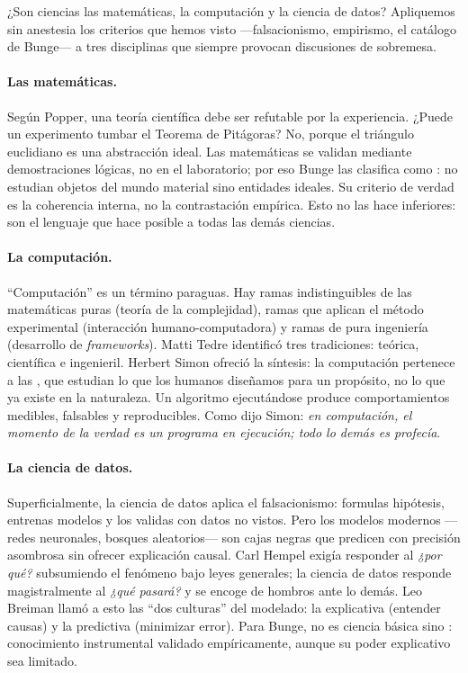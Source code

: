 \begin{digress}{¿Son ciencias las matemáticas, la computación y la ciencia de datos?}
	Apliquemos sin anestesia los criterios que hemos visto —falsacionismo, empirismo, el catálogo de Bunge— a tres disciplinas que siempre provocan discusiones de sobremesa.

	\paragraph*{Las matemáticas.} Según Popper, una teoría científica debe ser refutable por la experiencia\cite{Popper1959}.
	¿Puede un experimento tumbar el Teorema de Pitágoras?
	No, porque el triángulo euclidiano es una abstracción ideal.
	Las matemáticas se validan mediante demostraciones lógicas, no en el laboratorio; por eso Bunge las clasifica como : no estudian objetos del mundo material sino entidades ideales\cite{Bunge2002}.
	Su criterio de verdad es la coherencia interna, no la contrastación empírica.
	Esto no las hace inferiores: son el lenguaje que hace posible a todas las demás ciencias.

	\paragraph*{La computación.} “Computación” es un término paraguas.
	Hay ramas indistinguibles de las matemáticas puras (teoría de la complejidad), ramas que aplican el método experimental (interacción humano-computadora) y ramas de pura ingeniería (desarrollo de \emph{frameworks}).
	Matti Tedre identificó tres tradiciones: teórica, científica e ingenieril\cite{Tedre2008}.
	Herbert Simon ofreció la síntesis: la computación pertenece a las , que estudian lo que los humanos diseñamos para un propósito, no lo que ya existe en la naturaleza\cite{Simon1969}.
	Un algoritmo ejecutándose produce comportamientos medibles, falsables y reproducibles.
	Como dijo Simon: \emph{en computación, el momento de la verdad es un programa en ejecución; todo lo demás es profecía}.

	\paragraph*{La ciencia de datos.} Superficialmente, la ciencia de datos aplica el falsacionismo: formulas hipótesis, entrenas modelos y los validas con datos no vistos.
	Pero los modelos modernos —redes neuronales, bosques aleatorios— son cajas negras que predicen con precisión asombrosa sin ofrecer explicación causal.
	Carl Hempel exigía responder al \emph{¿por qué?} subsumiendo el fenómeno bajo leyes generales\cite{Hempel1965}; la ciencia de datos responde magistralmente al \emph{¿qué pasará?} y se encoge de hombros ante lo demás.
	Leo Breiman llamó a esto las “dos culturas” del modelado: la explicativa (entender causas) y la predictiva (minimizar error)\cite{Breiman2001}.
	Para Bunge, no es ciencia básica sino : conocimiento instrumental validado empíricamente, aunque su poder explicativo sea limitado\cite{Bunge2002}.


\end{digress}
